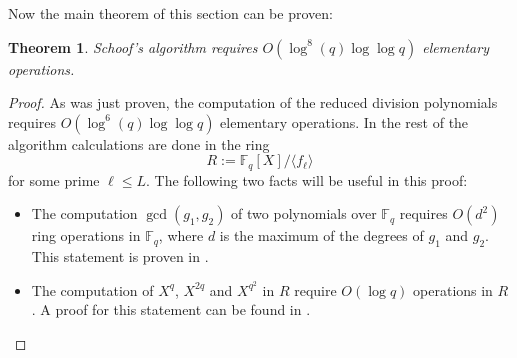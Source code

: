 \documentclass{article}
\numberwithin{equation}{section}
\newtheorem{theorem}{Theorem}[subsection]
\theoremstyle{definition}
\newcommand{\FF}[1]{{\mathbb F}_{#1}} %
\newcommand{\grgen}[1]{\langle #1 \rangle} %
\begin{document}
Now the main theorem of this section can be proven:

\begin{theorem}
Schoof's algorithm requires $O(\log^8 (q) \log \log q)$ elementary operations.
\end{theorem}

\begin{proof}
As was just proven, the computation of the reduced division polynomials requires $O(\log ^6 (q) \log \log q)$ elementary operations. In the rest of the algorithm calculations are done in the ring $$R:=\FF{q}[X]/\grgen{f_\ell}$$ for some prime $\ell \leq L$. The following two facts will be useful in this proof:

\begin{itemize}
\item The computation $\gcd(g_1,g_2)$ of two polynomials over $\FF{q}$ requires $O(d^2)$ ring operations in $\FF{q}$, where $d$ is the maximum of the degrees of $g_1$ and $g_2$. This statement is proven in \cite[3.1]{Winkler}.
\item The computation of $X^q$, $X^{2q}$ and $X^{q^2}$ in $R$ require $O(\log q)$ operations in $R$. A proof for this statement can be found in \cite[4.6.2]{Knutz}.
\end{itemize}


\end{proof}
\end{document}
